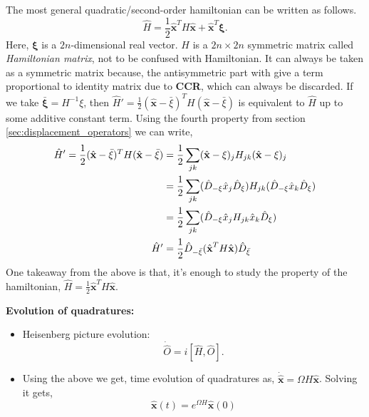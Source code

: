\documentclass[english,10pt,a4paper]{article}
\newcommand{\xx}{\hat{\textbf{x}}}
\newcommand{\dd}[1]{\hat{D}_{#1}}
\newcommand{\ham}{\hat H}
\newcommand{\half}{\frac{1}{2}}
\begin{document}
	The most general quadratic/second-order hamiltonian can be written as follows.
	\begin{equation}
		\label{eq:quad_ham}
		\ham = \half \xx^T H \xx + \xx^T \mathbf{\xi}.
	\end{equation}
	Here, $\mathbf{\xi}$ is a $2n$-dimensional real vector. $H$ is a $2n\times 2n$ symmetric matrix called \textit{Hamiltonian matrix}, not to be confused with Hamiltonian. It can always be taken as  a symmetric matrix because, the antisymmetric part with give a term proportional to identity matrix due to \textbf{CCR}, which can always be discarded. If we take $\bar{\mathbf{\xi}}=H^{-1}\xi$, then $\hat{H}' = \half (\xx-\bar{\xi})^T H (\xx-\bar{\xi})$ is equivalent to $\hat{H}$ up to some additive constant term. Using the fourth property from section \ref{sec:displacement_operators} we can write,
	\begin{align}
		\hat{H}' = \half (\xx-\bar{\xi})^T H (\xx-\bar{\xi}) &= \half \sum_{jk} (\xx-\xi) _j H_{jk} (\xx-\xi) _j \notag \\
		&= \half \sum_{jk} (\dd{-\xi} \hat x_j \dd{\xi})  H_{jk} (\dd{-\xi} \hat x_k \dd{\xi})  \notag\\
		&= \half \sum_{jk} (\dd{-\xi} \hat x_j H_{jk} \hat x_k \dd{\xi}) \notag\\
		\hat{H}'&= \half \dd{-\bar{\xi}} (\xx^T H \xx) \dd{\bar{\xi}}
	\end{align} 
	One takeaway from  the above is that, it's enough to study the property of the hamiltonian, $\hat{H} = \half \xx^T H \xx$.
	
	\textbf{Evolution of quadratures:} 
	\begin{itemize}
		\item Heisenberg picture evolution:
		\label{eq:heisenberg}
		\begin{equation}
			 \dot{\hat O} = i[\hat{H}, \hat{O}].
		\end{equation}
		\item Using the above we get, time evolution of quadratures as, $\dot{\xx} = \Omega H \xx$. Solving it gets,
		\begin{equation}
			\label{eq:symplectic_evolution}
			 \xx(t) = e^{\Omega H} \xx(0)
		\end{equation}
		
	\end{itemize}
	
\end{document}
